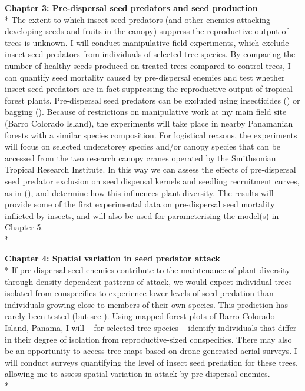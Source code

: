 \documentclass[12pt,a4]{RDGThesis}
\begin{document}
\textbf{Chapter 3: Pre-dispersal seed predators and seed production}\\*
    The extent to which insect seed predators (and other enemies attacking developing seeds and fruits in the canopy) suppress the reproductive output of trees is unknown. I will conduct manipulative field experiments, which exclude insect seed predators from individuals of selected tree species. By comparing the number of healthy seeds produced on treated trees compared to control trees, I can quantify seed mortality caused by pre-dispersal enemies and test whether insect seed predators are in fact suppressing the reproductive output of tropical forest plants. Pre-dispersal seed predators can be excluded using insecticides (\cite{ loudaLimitationRecruitmentShrub1982}) or bagging (\cite{ nakagawaPredispersalSeedPredation2005}). Because of restrictions on manipulative work at my main field site (Barro Colorado Island), the experiments will take place in nearby Panamanian forests with a similar species composition. For logistical reasons, the experiments will focus on selected understorey species and/or canopy species that can be accessed from the two research canopy cranes operated by the Smithsonian Tropical Research Institute. In this way we can assess the effects of pre-dispersal seed predator exclusion on seed dispersal kernels and seedling recruitment curves, as in (\cite{ janzenHerbivoresNumberTree1970}), and determine how this influences plant diversity. The results will provide some of the first experimental data on pre-dispersal seed mortality inflicted by insects, and will also be used for parameterising the model(s) in Chapter 5.\\*
    
\textbf{Chapter 4: Spatial variation in seed predator attack}\\*
    If pre-dispersal seed enemies contribute to the maintenance of plant diversity through density-dependent patterns of attack, we would expect individual trees isolated from conspecifics to experience lower levels of seed predation than individuals growing close to members of their own species. This prediction has rarely been tested (but see \cite{jonesDensitydependentPredispersalSeed2010}). Using mapped forest plots of Barro Colorado Island, Panama, I will – for selected tree species – identify individuals that differ in their degree of isolation from reproductive-sized conspecifics. There may also be an opportunity to access tree maps based on drone-generated aerial surveys. I will conduct surveys quantifying the level of insect seed predation for these trees, allowing me to assess spatial variation in attack by pre-dispersal enemies. \\*
\end{document}

